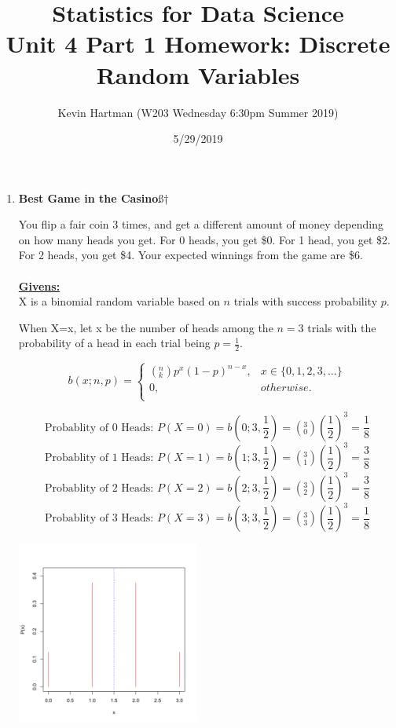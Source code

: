 \documentclass[12pt,a4paper]{article}
\numberwithin{equation}{subsection}
\begin{document}



\author{Kevin Hartman (W203 Wednesday 6:30pm Summer 2019)}
\date{5/29/2019}
\title{Statistics for Data Science \\
       Unit 4 Part 1 Homework: Discrete Random Variables}
\maketitle


\begin{enumerate}

\item \textbf{Best Game in the Casino}ß†

You flip a fair coin 3 times, and get a different amount of money depending on how many heads you get. For 0 heads, you get \$0. For 1 head, you get \$2. For 2 heads, you get \$4. Your expected winnings from the game are \$6. 
\\
\\
\textbf{\underline{Givens:}}
\\
X is a binomial random variable based on $n$ trials with success probability $p$.

When X=x, let x be the number of heads among the $n=3$ trials with the probability of a head in each trial being $p=\frac{1}{2}$.

$$b(x;n,p) = \begin{cases}
(^n_k)p^x(1-p)^{n-x}, &x \in \{0,1,2,3,...\}\\
0, &otherwise.\\
\end{cases}
$$

$$\text{Probablity of 0 Heads: }P(X=0)=b(0;3,\frac{1}{2}) = (^3_0)(\frac{1}{2})^3 = \frac{1}{8}$$
$$\text{Probablity of 1 Heads: }P(X=1)=b(1;3,\frac{1}{2}) = (^3_1)(\frac{1}{2})^3 = \frac{3}{8}$$
$$\text{Probablity of 2 Heads: }P(X=2)=b(2;3,\frac{1}{2}) = (^3_2)(\frac{1}{2})^3 = \frac{3}{8}$$
$$\text{Probablity of 3 Heads: }P(X=3)=b(3;3,\frac{1}{2}) = (^3_3)(\frac{1}{2})^3 = \frac{1}{8}$$

	

\begin{minipage}{\linewidth}
  \centering
  \includegraphics[width=6cm]{Kevin_Hartman_unit_4_part_1_hw-xbinom}
\end{minipage}


\end{enumerate}
\end{document}
